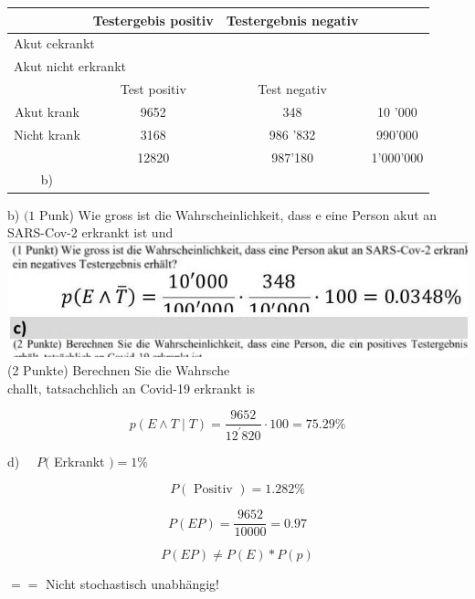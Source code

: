\documentclass[10pt]{article}
\begin{document}
{\begin{center}
\begin{tabular}{|c|c|c|c|}
\hline
 & Testergebis positiv & Testergebnis negativ &  \\
\hline
\multicolumn{4}{|l|}{Akut cekrankt} \\
\hline
\multicolumn{4}{|l|}{\multirow[t]{2}{*}{Akut nicht erkrankt}} \\
\hline
 &  &  &  \\
\hline
 & Test positiv & Test negativ &  \\
\hline
Akut krank & 9652 & 348 & 10 '000 \\
\hline
Nicht krank & 3168 & 986 '832 & 990'000 \\
\hline
 & 12820 & 987'180 & 1'000'000 \\
\hline
b) &  &  &  \\
\hline
\end{tabular}
\end{center}

b) $(1$ Punk) Wie gross ist die Wahrscheinlichkeit, dass e eine Person akut an SARS-Cov-2 erkrankt ist und\\
\includegraphics[max width=\textwidth, center]{2024_12_29_0906b02acf849bda8665g-4(2)}\\
\includegraphics[max width=\textwidth]{2024_12_29_0906b02acf849bda8665g-4(9)} (2 Punkte) Berechnen Sie die Wahrsche\\
challt, tatsachchlich an Covid-19 erkrankt is

$$
p(E \wedge T \mid T)=\frac{9652}{12^{\prime} 820} \cdot 100=75.29 \%
$$

d) $\quad P($ Erkrankt $)=1 \%$

$$
P(\text { Positiv })=1.282 \%
$$

$$
P(E P)=\frac{9652}{10000}=0.97
$$

$$
P(E P) \neq P(E) * P(p)
$$

$==$ Nicht stochastisch unabhängig!

}
\end{document}
